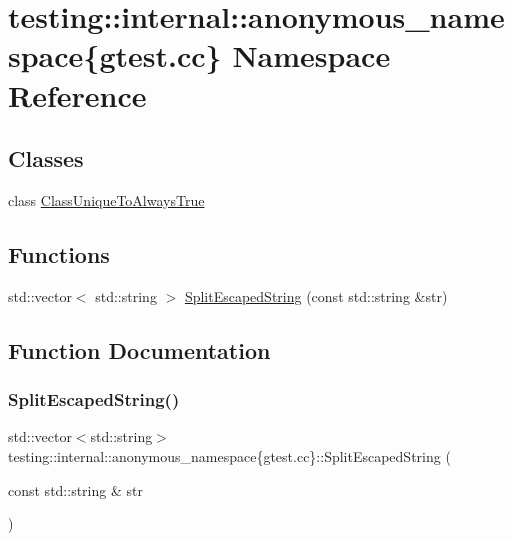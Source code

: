 \hypertarget{namespacetesting_1_1internal_1_1anonymous__namespace_02gtest_8cc_03}{}\section{testing\+:\+:internal\+:\+:anonymous\+\_\+namespace\{gtest.\+cc\} Namespace Reference}
\label{namespacetesting_1_1internal_1_1anonymous__namespace_02gtest_8cc_03}
\subsection*{Classes}
\begin{DoxyCompactItemize}
\item 
class \hyperlink{classtesting_1_1internal_1_1anonymous__namespace_02gtest_8cc_03_1_1ClassUniqueToAlwaysTrue}{Class\+Unique\+To\+Always\+True}
\end{DoxyCompactItemize}
\subsection*{Functions}
\begin{DoxyCompactItemize}
\item 
std\+::vector$<$ std\+::string $>$ \hyperlink{namespacetesting_1_1internal_1_1anonymous__namespace_02gtest_8cc_03_a87e3d38ad422ce7018c6fcd4d1f3a938}{Split\+Escaped\+String} (const std\+::string \&str)
\end{DoxyCompactItemize}


\subsection{Function Documentation}
\mbox{\label{namespacetesting_1_1internal_1_1anonymous__namespace_02gtest_8cc_03_a87e3d38ad422ce7018c6fcd4d1f3a938}} 
\subsubsection{\texorpdfstring{Split\+Escaped\+String()}{SplitEscapedString()}}
{\footnotesize\ttfamily std\+::vector$<$std\+::string$>$ testing\+::internal\+::anonymous\+\_\+namespace\{gtest.\+cc\}\+::Split\+Escaped\+String (\begin{DoxyParamCaption}\item[{const std\+::string \&}]{str }\end{DoxyParamCaption})}



